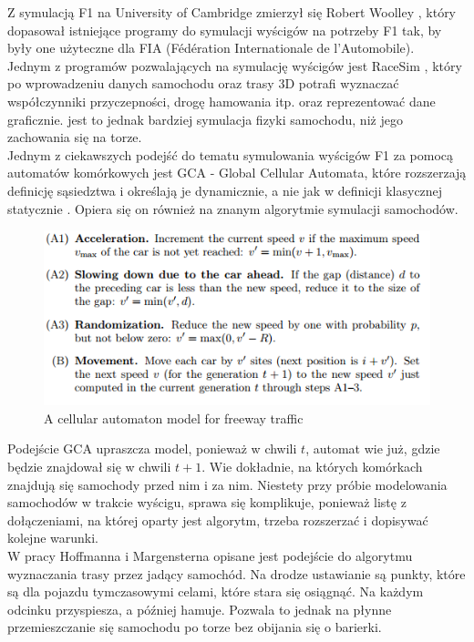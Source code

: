 \documentclass{article}
\begin{document}
Z symulacją F1 na University of Cambridge zmierzył się Robert Woolley \cite{woolley}, który dopasował istniejące programy do symulacji wyścigów na potrzeby F1 tak, by były one użyteczne dla FIA (Fédération Internationale de l'Automobile). \\

Jednym z programów pozwalających na symulację wyścigów jest RaceSim \cite{race}, który po wprowadzeniu danych samochodu oraz trasy 3D potrafi wyznaczać współczynniki przyczepności, drogę hamowania itp. oraz reprezentować dane graficznie.  jest to jednak bardziej symulacja fizyki samochodu, niż jego zachowania się na torze. \\

Jednym z ciekawszych podejść do tematu symulowania wyścigów F1 za pomocą automatów komórkowych jest GCA - Global Cellular Automata, które rozszerzają definicję sąsiedztwa i określają je dynamicznie, a nie jak w definicji klasycznej statycznie \cite{gca}. Opiera się on również na znanym algorytmie symulacji samochodów.

\begin{center}
\begin{figure}[h]
\includegraphics[scale=0.9]{alg.png}
\caption{A cellular automaton model for freeway traffic}
\end{figure}
\end{center}

Podejście GCA upraszcza model, ponieważ w chwili $t$, automat wie już, gdzie będzie znajdował się w chwili $t+1$. Wie dokładnie, na których komórkach znajdują się samochody przed nim i za nim. Niestety przy próbie modelowania samochodów w trakcie wyścigu, sprawa się komplikuje, ponieważ listę z dołączeniami, na której oparty jest algorytm, trzeba rozszerzać i dopisywać kolejne warunki. \\

W pracy Hoffmanna i Margensterna \cite{maurice} opisane jest podejście do algorytmu wyznaczania trasy przez jadący samochód. Na drodze ustawianie są punkty, które są dla pojazdu tymczasowymi celami, które stara się osiągnąć. Na każdym odcinku przyspiesza, a później hamuje. Pozwala to jednak na płynne przemieszczanie się samochodu po torze bez obijania się o barierki.
\end{document}
